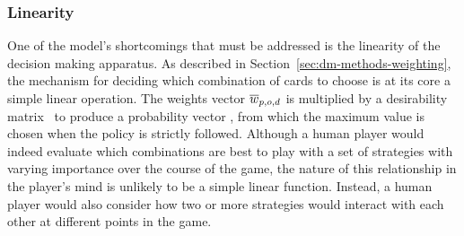 
\subsubsection*{Linearity}
\label{sec:disc-shortcomings-linearity}


One of the model's shortcomings that must be addressed is the linearity
of the decision making apparatus.
%
As described in Section~\ref{sec:dm-methods-weighting},
the mechanism for deciding which combination of cards to choose is\textemdash
at its core\textemdash
a simple linear operation.
%
The weights vector $\overline{w}_{p,o,d}$ is multiplied by a desirability matrix \Smat\
to produce a probability vector \pvec,
from which the maximum value is chosen when the policy is strictly followed.
%
Although a human player would indeed evaluate which combinations are best
to play with a set of strategies with varying importance over the course
of the game,
the nature of this relationship in the player's mind is unlikely
to be a simple linear function.
%
Instead,
a human player would also consider how two or more strategies would interact
with each other at different points in the game.


